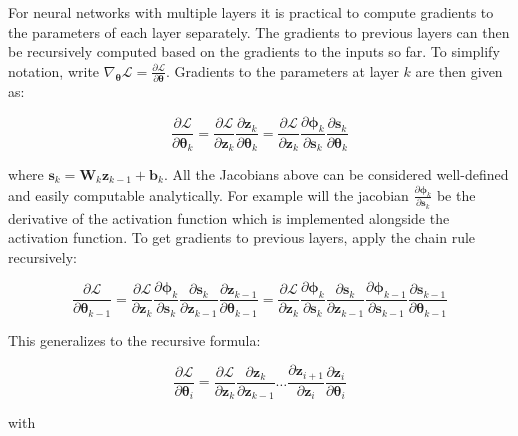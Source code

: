For neural networks with multiple layers it is practical to compute gradients to the parameters of each layer separately. The gradients to previous layers can then be recursively computed based on the gradients to the inputs so far. To simplify notation, write $\nabla_{\bm{\theta}} \mathcal{L} = \frac{\partial \mathcal{L}}{\partial \bm{\theta}}$. Gradients to the parameters at layer $k$ are then given as:

\begin{equation}
    \frac{\partial \mathcal{L}}{\partial \bm{\theta}_k}
    = \frac{\partial \mathcal{L}}{\partial \bm{z}_k} \frac{\partial \bm{z}_k}{\partial \bm{\theta}_k}
    = \frac{\partial \mathcal{L}}{\partial \bm{z}_k} \frac{\partial \bm{\phi}_k}{\partial \bm{s}_k} \frac{\partial \bm{s}_k}{\partial \bm{\theta}_k}
\end{equation}

\noindent where $\bm{s}_k = \bm{W}_k \bm{z}_{k-1} + \bm{b}_k$. All the Jacobians above can be considered well-defined and easily computable analytically. For example will the jacobian $\frac{\partial \bm{\phi}_k}{\partial \bm{s}_k}$ be the derivative of the activation function which is implemented alongside the activation function. To get gradients to previous layers, apply the chain rule recursively:

\begin{equation}
    \frac{\partial \mathcal{L}}{\partial \bm{\theta}_{k-1}}
    = \frac{\partial \mathcal{L}}{\partial \bm{z}_k} \frac{\partial \bm{\phi}_k}{\partial \bm{s}_k} \frac{\partial \bm{s}_k}{\partial \bm{z}_{k-1}} \frac{\partial \bm{z}_{k-1}}{\partial \bm{\theta}_{k-1}}
    = \frac{\partial \mathcal{L}}{\partial \bm{z}_k} \frac{\partial \bm{\phi}_k}{\partial \bm{s}_k} \frac{\partial \bm{s}_k}{\partial \bm{z}_{k-1}} \frac{\partial \bm{\phi}_{k-1}}{\partial \bm{s}_{k-1}} \frac{\partial \bm{s}_{k-1}}{\partial \bm{\theta}_{k-1}}
\end{equation}

This generalizes to the recursive formula:

\begin{equation}
    \frac{\partial \mathcal{L}}{\partial \bm{\theta}_{i}}
    = \frac{\partial \mathcal{L}}{\partial \bm{z}_k} \frac{\partial \bm{z}_k}{\partial \bm{z}_{k-1}} \dots \frac{\partial \bm{z}_{i+1}}{\partial \bm{z}_i} \frac{\partial \bm{z}_i}{\partial \bm{\theta}_i}
\label{eq:backprop}
\end{equation}

\noindent with


